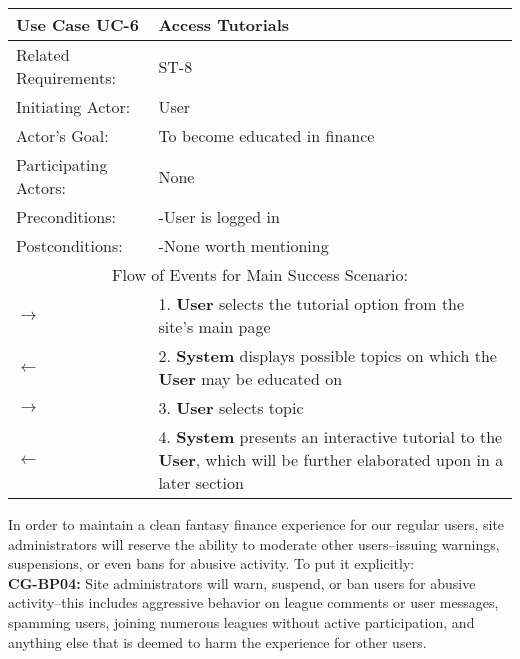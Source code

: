 \begin{centering}
\renewcommand\arraystretch{1.3} %
\begin{longtable}{|p{1.2in} p{5in}|}
\hline
\bfseries{\color{color1}Use Case UC-6} & \bfseries{\color{color1}Access Tutorials} \\
\hline
Related Requirements: & ST-8 \\ 
Initiating Actor:     & User \\
Actor's Goal:         & To become educated in finance \\
Participating Actors:  & None \\
Preconditions:        & -User is logged in \\
Postconditions:       & -None worth mentioning \\
\hline
\multicolumn{2}{|c|}{\color{color1}Flow of Events for Main Success Scenario:}\\
\hline
$\rightarrow$ & 1. \textbf{User} selects the tutorial option from the site's main page \\
$\leftarrow$ & 2. \textbf{System} displays possible topics on which the \textbf{User} may be educated on \\
$\rightarrow$ & 3. \textbf{User} selects topic \\
$\leftarrow$ & 4. \textbf{System} presents an interactive tutorial to the \textbf{User}, which will be further elaborated upon in a later section \\
\hline
\end{longtable}
\end{centering}

In order to maintain a clean fantasy finance experience for our regular users, site administrators will reserve the ability to moderate other users--issuing warnings, suspensions, or even bans for abusive activity. To put it explicitly: \\
\textbf{CG-BP04:} Site administrators will warn, suspend, or ban users for abusive activity--this includes aggressive behavior on league comments or user messages, spamming users, joining numerous leagues without active participation, and anything else that is deemed to harm the experience for other users. \\


